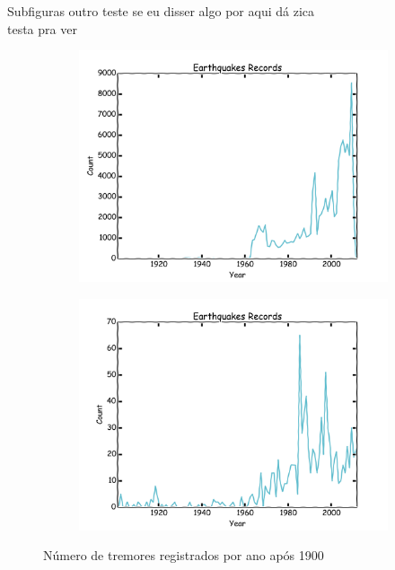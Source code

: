 \documentclass[ucs,8pt]{beamer}
\begin{document}
\begin{frame}{Subfiguras outro teste}
se eu disser algo por aqui dá zica \\
testa pra ver
\begin{figure}
	\centering
	\begin{subfigure}[t]{0.48\textheight}
		  	\centering
			\includegraphics[height=1.00\textheight]{hmtk_sa3_rate}
			\label{fig:sa_eq_record}
	\end{subfigure}%
	\quad %
	\begin{subfigure}[t]{0.48\textheight}
		  	\centering
			\includegraphics[height=1.00\textheight]{hmtk_bsb2013_rate}
			\label{fig:br_eq_record}
    \end{subfigure}
	\caption{Número de tremores registrados por ano após 1900}
	\label{fig:eq_record}
\end{figure}
\end{frame}
\end{document}
